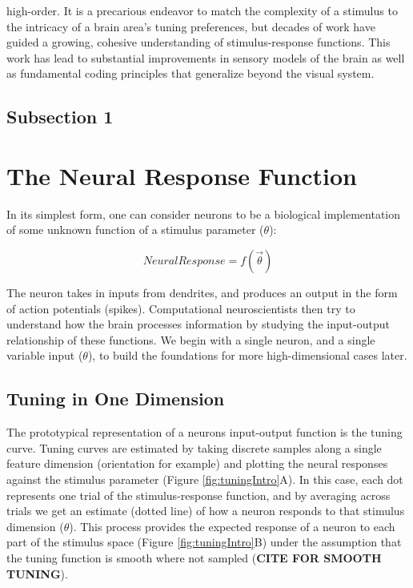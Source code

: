 high-order. It is a precarious endeavor to match the complexity of a stimulus to the intricacy of a brain area's tuning preferences, but decades of work have guided a growing, cohesive understanding of stimulus-response functions. This work has lead to substantial improvements in sensory models of the brain as well as fundamental coding principles that generalize beyond the visual system.

\subsection{Subsection 1}




\section{The Neural Response Function}
In its simplest form, one can consider neurons to be a biological implementation of some unknown function of a stimulus parameter ($\theta$):

\begin{equation}
Neural Response = f(\vec{\theta})
\end{equation}


The neuron takes in inputs from dendrites, and produces an output in the form of action potentials (spikes). Computational neuroscientists then try to understand how the brain processes information by studying the input-output relationship of these functions. We begin with a single neuron, and a single variable input ($\theta$), to build the foundations for more high-dimensional cases later.

\subsection{Tuning in One Dimension}

The prototypical representation of a neurons input-output function is the tuning curve. Tuning curves are estimated by taking discrete samples along a single feature dimension (orientation for example) and plotting the neural responses against the stimulus parameter (Figure \ref{fig:tuningIntro}A). In this case, each dot represents one trial of the stimulus-response function, and by averaging across trials we get an estimate (dotted line) of how a neuron responds to that stimulus dimension ($\theta$). This process provides the expected response of a neuron to each part of the stimulus space (Figure \ref{fig:tuningIntro}B) under the assumption that the tuning function is smooth where not sampled (\textbf{CITE FOR SMOOTH TUNING}). 
 
